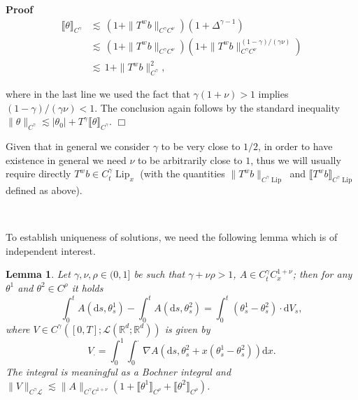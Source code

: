 \documentclass[10pt]{article}
\newcommand{\mathd}{\mathrm{d}}
\newcommand{\tmop}[1]{\ensuremath{\operatorname{#1}}}
\newenvironment{proof}{\noindent\textbf{Proof\ }}{\hspace*{\fill}$\Box$\medskip}
\newtheorem{lemma}{Lemma}
\begin{document}
\begin{proof}
  \begin{align*}
    \llbracket \theta \rrbracket_{C^{\gamma}} & \lesssim \, (1 + \| T^w b
    \|_{C^{\gamma} C^{\nu}}) (1 + \Delta^{\gamma - 1})\\
    & \lesssim \, (1 + \| T^w b \|_{C^{\gamma} C^{\nu}}) (1 + \| T^w b
    \|_{C^{\gamma} C^{\nu}}^{(1 - \gamma) / (\gamma \nu)})\\
    & \lesssim \, 1 + \| T^w b \|_{C^{\gamma}}^2,
  \end{align*}
  
  where in the last line we used the fact that $\gamma (1 + \nu) > 1$ implies
  $(1 - \gamma) / (\gamma \nu) < 1$. The conclusion again follows by the
  standard inequality $\| \theta \|_{C^{\gamma}} \lesssim | \theta_0 | +
  T^{\gamma} \llbracket \theta \rrbracket_{C^{\gamma}}$.
\end{proof}

Given that in general we consider $\gamma$ to be very close to $1 / 2$, in
order to have existence in general we need $\nu$ to be arbitrarily close to
$1$, thus we will usually require directly $T^w b \in C^{\gamma}_t
\tmop{Lip}_x$ (with the quantities $\| T^w b \|_{C^{\gamma} \tmop{Lip}}$ and
$\llbracket T^w b \rrbracket_{C^{\gamma} \tmop{Lip}}$ defined as above).

\

To establish uniqueness of solutions, we need the following lemma which is of
independent interest.

\begin{lemma}
  \label{sec4.1 technical lemma}Let $\gamma, \nu, \rho \in (0, 1]$ be such
  that $\gamma + \nu \rho > 1$, $A \in C^{\gamma}_t C^{1 + \nu}_x$; then for
  any $\theta^1$ and $\theta^2 \in C^{\rho}$ it holds
  \[ \int_0^t A (\mathd s, \theta^1_s) - \int_0^t A (\mathd s, \theta^2_s) =
     \int_0^t (\theta^1_s - \theta^2_s) \cdot \mathd V_s, \]
  where $V \in C^{\gamma} ([0, T] ; \mathcal{L} (\mathbb{R}^d ;
  \mathbb{R}^d))$ is given by
  \[ V_{\cdot} = \int_0^1 \int_0^{\cdot} \nabla A (\mathd s, \theta^2_s + x
     (\theta^1_s - \theta^2_s)) \mathd x. \]
  The integral is meaningful as a Bochner integral and $\| V \|_{C^{\gamma}
  \mathcal{L}} \lesssim \| A \|_{C^{\gamma} C^{1 + \nu}} (1 + \llbracket
  \theta^1 \rrbracket_{C^{\rho}} + \llbracket \theta^2
  \rrbracket_{C^{\rho}})$.
\end{lemma}
\end{document}
